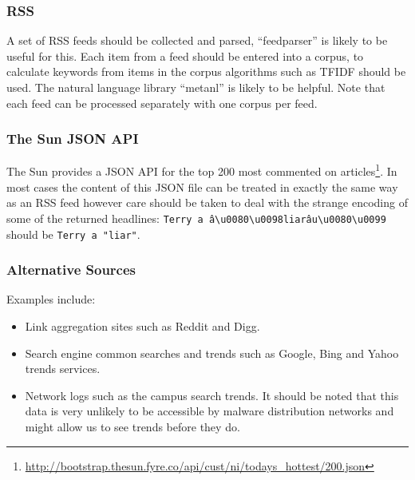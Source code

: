 \subsubsection{RSS}
A set of RSS feeds should be collected and parsed, ``feedparser'' is likely to be useful for this.  Each item from a feed should be entered into a corpus, to calculate keywords from items in the corpus algorithms such as TFIDF should be used. The natural language library ``metanl'' is likely to be helpful. Note that each feed can be processed separately with one corpus per feed.

\subsubsection{The Sun JSON API}
The Sun provides a JSON API for the top 200 most commented on articles\footnote{\url{http://bootstrap.thesun.fyre.co/api/cust/ni/todays_hottest/200.json}}. In most cases the content of this JSON file can be treated in exactly the same way as an RSS feed however care should be taken to deal with the strange encoding of some of the returned headlines: \verb`Terry a â\u0080\u0098liarâu\u0080\u0099` should be \verb`Terry a "liar"`.

\subsubsection{Alternative Sources}
Examples include:
\begin{itemize}
    \item Link aggregation sites such as Reddit and Digg.
    \item Search engine common searches and trends such as Google, Bing and Yahoo trends services.
    \item Network logs such as the campus search trends. It should be noted that this data is very unlikely to be accessible by malware distribution networks and might allow us to see trends before they do.
\end{itemize}

